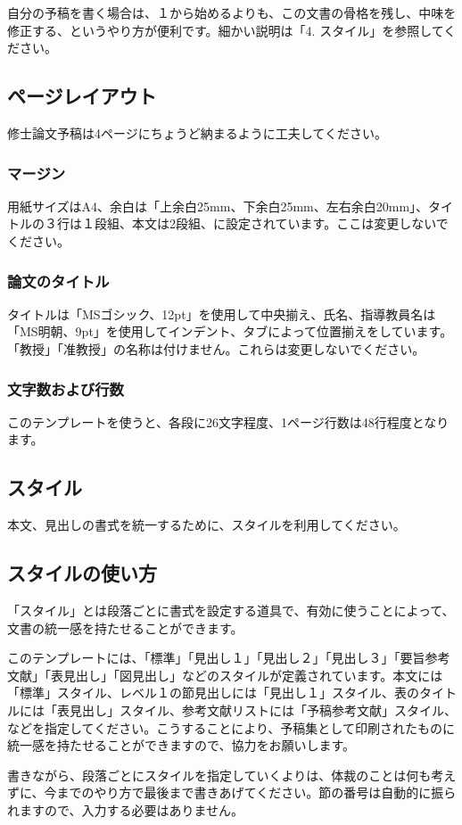 \documentclass[9pt,twocolumn]{jarticle}
\begin{document}
自分の予稿を書く場合は、１から始めるよりも、この文書の骨格を残し、中味を修正する、というやり方が便利です。細かい説明は「4. スタイル」を参照してください。
\subsection{ページレイアウト}
修士論文予稿は4ページにちょうど納まるように工夫してください。
\subsubsection{マージン}
用紙サイズはA4、余白は「上余白25mm、下余白25mm、左右余白20mm」、タイトルの３行は１段組、本文は2段組、に設定されています。ここは変更しないでください。
\subsubsection{論文のタイトル}
タイトルは「MSゴシック、12pt」を使用して中央揃え、氏名、指導教員名は「MS明朝、9pt」を使用してインデント、タブによって位置揃えをしています。「教授」「准教授」の名称は付けません。これらは変更しないでください。
\subsubsection{文字数および行数}
このテンプレートを使うと、各段に26文字程度、1ページ行数は48行程度となります。
\subsection{スタイル}
本文、見出しの書式を統一するために、スタイルを利用してください。
\subsection{スタイルの使い方}
「スタイル」とは段落ごとに書式を設定する道具で、有効に使うことによって、文書の統一感を持たせることができます。

このテンプレートには、「標準」「見出し１」「見出し２」「見出し３」「要旨参考文献」「表見出し」「図見出し」などのスタイルが定義されています。本文には「標準」スタイル、レベル１の節見出しには「見出し１」スタイル、表のタイトルには「表見出し」スタイル、参考文献リストには「予稿参考文献」スタイル、などを指定してください。こうすることにより、予稿集として印刷されたものに統一感を持たせることができますので、協力をお願いします。

書きながら、段落ごとにスタイルを指定していくよりは、体裁のことは何も考えずに、今までのやり方で最後まで書きあげてください。節の番号は自動的に振られますので、入力する必要はありません。
\end{document}
